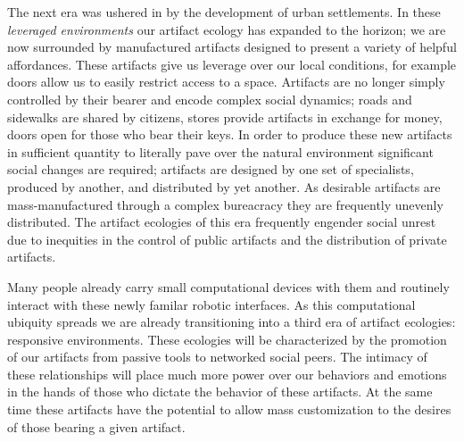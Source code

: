 The next era was ushered in by the development of urban settlements. 
In these \emph{leveraged environments} our artifact ecology has expanded to the horizon; we are now surrounded by manufactured artifacts designed to present a variety of helpful affordances.
These artifacts give us leverage over our local conditions, for example doors allow us to easily restrict access to a space.
Artifacts are no longer simply controlled by their bearer and encode complex social dynamics; roads and sidewalks are shared by citizens, stores provide artifacts in exchange for money, doors open for those who bear their keys.
In order to produce these new artifacts in sufficient quantity to literally pave over the natural environment significant social changes are required; artifacts are designed by one set of specialists, produced by another, and distributed by yet another.
As desirable artifacts are mass-manufactured through a complex bureacracy they are frequently unevenly distributed.
The artifact ecologies of this era frequently engender social unrest due to inequities in the control of public artifacts and the distribution of private artifacts.

Many people already carry small computational devices with them and routinely interact with these newly familar robotic interfaces. As this computational ubiquity spreads we are already transitioning into a third era of artifact ecologies: responsive environments. These ecologies will be characterized by the promotion of our artifacts from passive tools to networked social peers. The intimacy of these relationships will place much more power over our behaviors and emotions in the hands of those who dictate the behavior of these artifacts. At the same time these artifacts have the potential to allow mass customization to the desires of those bearing a given artifact. 

